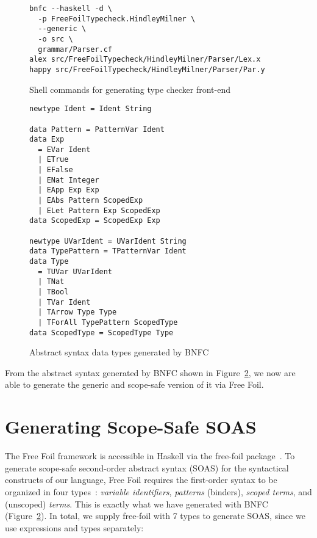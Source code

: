 \begin{figure}[H]
  \begin{verbatim}
bnfc --haskell -d \
  -p FreeFoilTypecheck.HindleyMilner \
  --generic \
  -o src \
  grammar/Parser.cf
alex src/FreeFoilTypecheck/HindleyMilner/Parser/Lex.x
happy src/FreeFoilTypecheck/HindleyMilner/Parser/Par.y
  \end{verbatim}
  \caption{Shell commands for generating type checker front-end}
  \label{fig:code-gen-cli}
\end{figure}

\begin{figure}[H]
\begin{verbatim}
newtype Ident = Ident String

data Pattern = PatternVar Ident
data Exp
  = EVar Ident
  | ETrue
  | EFalse
  | ENat Integer
  | EApp Exp Exp
  | EAbs Pattern ScopedExp
  | ELet Pattern Exp ScopedExp
data ScopedExp = ScopedExp Exp

newtype UVarIdent = UVarIdent String
data TypePattern = TPatternVar Ident
data Type
  = TUVar UVarIdent
  | TNat
  | TBool
  | TVar Ident
  | TArrow Type Type
  | TForAll TypePattern ScopedType
data ScopedType = ScopedType Type
\end{verbatim}
  \caption{Abstract syntax data types generated by BNFC}
  \label{fig:ast-types-bnfs}
\end{figure}

From the abstract syntax generated by BNFC shown in Figure~\ref{fig:ast-types-bnfs}, we now are able to generate the generic and scope-safe version of it via Free Foil.

\section{Generating Scope-Safe SOAS}

The Free Foil framework is accessible in Haskell via the free-foil package~\cite{free-foil}. To generate scope-safe second-order abstract syntax (SOAS) for the syntactical constructs of our language, Free Foil requires the first-order syntax to be organized in four types~\cite{FreeFoil}: \textit{variable identifiers}, \textit{patterns} (binders), \textit{scoped terms}, and (unscoped) \textit{terms}. This is exactly what we have generated with BNFC (Figure~\ref{fig:ast-types-bnfs}). In total, we supply free-foil with 7 types to generate SOAS, since we use expressions and types separately:

